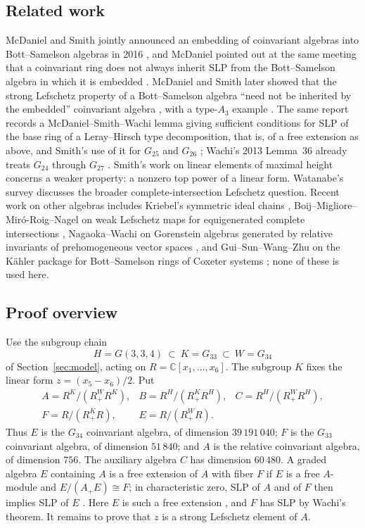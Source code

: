 \documentclass[11pt]{article}
\theoremstyle{definition}
\newcommand{\C}{\mathbb C}
\begin{document}
\subsection*{Related work}
McDaniel and Smith jointly announced an embedding of coinvariant algebras
into Bott--Samelson algebras in 2016 \cite[pp.~5, 10--11]{BIRS16}, and
McDaniel pointed out at the same meeting that a coinvariant ring does not
always inherit SLP from the Bott--Samelson algebra in which it is
embedded \cite[p.~5]{BIRS16}. McDaniel and Smith later showed that the
strong Lefschetz property of a Bott--Samelson algebra ``need not be
inherited by the embedded'' coinvariant algebra \cite[Abstract]{McDSmith},
with a type-$A_3$ example \cite[Proposition~5.9]{McDSmith}. The same report
records a McDaniel--Smith--Wachi lemma giving sufficient conditions for
SLP of the base ring of a Leray--Hirsch type decomposition, that is, of
a free extension as above, and Smith's use of it for $G_{25}$ and
$G_{26}$ \cite[\S4.4, p.~10]{BIRS16}; Wachi's 2013 Lemma~36 already
treats $G_{24}$ through $G_{27}$ \cite{WachiLecture}. Smith's work on
linear elements of maximal height \cite{Smith24} concerns a weaker
property: a nonzero top power of a linear form. Watanabe's survey
\cite[\S8]{Watanabe20} discusses the broader complete-intersection
Lefschetz question. Recent work on other algebras includes Kriebel's
symmetric ideal chains \cite{Kriebel}, Boij--Migliore--Mir\'o-Roig--Nagel
on weak Lefschetz maps for equigenerated complete intersections
\cite[Theorem~1.5]{BMMN26}, Nagaoka--Wachi on Gorenstein algebras
generated by relative invariants of prehomogeneous vector spaces
\cite[Theorem~4]{NW24}, and Gui--Sun--Wang--Zhu on the K\"ahler package
for Bott--Samelson rings of Coxeter systems \cite[Theorem~1.2]{GSWZ24};
none of these is used here.

\subsection*{Proof overview}
Use the subgroup chain
\[
                   H=G(3,3,4)\ \subset\ K=G_{33}\ \subset\ W=G_{34}
\]
of Section~\ref{sec:model}, acting on $R=\C[x_1,\ldots,x_6]$. The
subgroup $K$ fixes the linear form $z=(x_5-x_6)/2$. Put
\[
\begin{array}{lll}
 A=R^K/(R^W_+R^K),& B=R^H/(R^K_+R^H),& C=R^H/(R^W_+R^H),\\[2pt]
 F=R/(R^K_+R),& E=R/(R^W_+R).&
\end{array}
\]
Thus $E$ is the $G_{34}$ coinvariant algebra, of dimension
$39\,191\,040$; $F$ is the $G_{33}$ coinvariant algebra, of dimension
$51\,840$; and $A$ is the relative coinvariant algebra, of dimension
$756$. The auxiliary algebra $C$ has dimension $60\,480$. A graded
algebra $E$ containing $A$ is a free extension of $A$ with fiber $F$ if
$E$ is a free $A$-module and $E/(A_+E)\cong F$; in characteristic zero,
SLP of $A$ and of $F$ then implies SLP of $E$ \cite{HW07,MCCM}. Here $E$
is such a free extension \cite[Proposition~3.1]{MCCM}, and $F$ has SLP
by Wachi's theorem. It remains to prove that $z$ is a strong Lefschetz
element of $A$.
\end{document}
